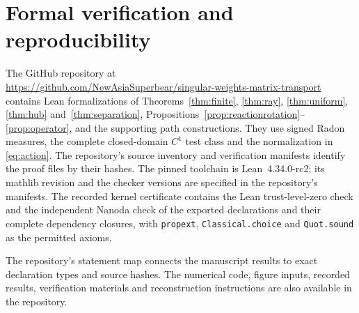 \section{Formal verification and reproducibility}\label{sec:verification}
The GitHub repository at\\
\url{https://github.com/NewAsiaSuperbear/singular-weights-matrix-transport}\\
contains Lean formalizations of
Theorems~\ref{thm:finite}, \ref{thm:ray}, \ref{thm:uniform},
\ref{thm:hub} and~\ref{thm:separation},
Propositions~\ref{prop:reactionrotation}--\ref{prop:operator}, and the
supporting path constructions. They use signed Radon measures, the complete
closed-domain $C^1$ test class and the normalization in \eqref{eq:action}.
The repository's source inventory and verification manifests identify
the proof files by their hashes.
The pinned toolchain is Lean~4.34.0-rc2; its mathlib revision and the checker
versions are specified in the repository's manifests.
The recorded kernel certificate contains the Lean trust-level-zero check
and the independent Nanoda check of the exported declarations and their
complete dependency closures, with \texttt{propext}, \texttt{Classical.choice}
and \texttt{Quot.sound} as the permitted axioms.

The repository's statement map connects the manuscript results to exact
declaration types and source hashes. The numerical code, figure inputs,
recorded results, verification materials and reconstruction instructions
are also available in the repository.
